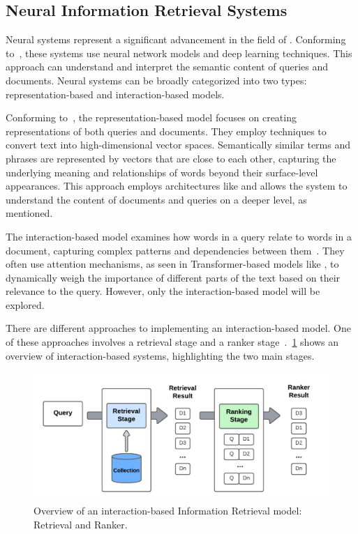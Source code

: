 \subsection{Neural Information Retrieval Systems}

Neural {\ir} systems represent a significant advancement in the field of {\ir}. Conforming to~\citet{mitra_introduction_nodate}, these systems use neural network models and deep learning techniques. This approach can understand and interpret the semantic content of queries and documents. Neural {\ir} systems can be broadly categorized into two types: representation-based and interaction-based models.

Conforming to~\citet{chen_integrating_2023}, the representation-based model focuses on creating representations of both queries and documents. They employ techniques to convert text into high-dimensional vector spaces. Semantically similar terms and phrases are represented by vectors that are close to each other, capturing the underlying meaning and relationships of words beyond their surface-level appearances. This approach employs architectures like {\rnn} and allows the system to understand the content of documents and queries on a deeper level, as~\citet{liu_deep_2022} mentioned.

The interaction-based model examines how words in a query relate to words in a document, capturing complex patterns and dependencies between them~\cite{chen_integrating_2023}. They often use attention mechanisms, as seen in Transformer-based models like {\bert}, to dynamically weigh the importance of different parts of the text based on their relevance to the query. However, only the interaction-based model will be explored.

There are different approaches to implementing an interaction-based model. One of these approaches involves a retrieval stage and a ranker stage~\cite{mitra_introduction_nodate}.~\ref{fig_ir_system} shows an overview of interaction-based {\ir} systems, highlighting the two main stages.

\begin{figure}[ht]
    \includegraphics[width=14cm]{figs/chapter2/IR_system.png}
    \centering
    \caption[Overview of an interaction-based Information Retrieval model]{Overview of an interaction-based Information Retrieval model: Retrieval and Ranker.}
    \label{fig_ir_system}
\end{figure}

